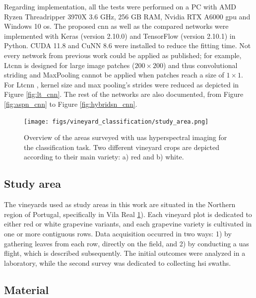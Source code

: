 Regarding implementation, all the tests were performed on a PC with AMD Ryzen Threadripper 3970X 3.6 GHz, 256 GB RAM, Nvidia RTX A6000 \acrshort{gpu} and Windows 10 \acrshort{os}. The proposed \acrshort{cnn} as well as the compared networks were implemented with Keras (version 2.10.0) and TensorFlow (version 2.10.1) in Python. CUDA 11.8 and CuNN 8.6 were installed to reduce the fitting time. Not every network from previous work could be applied as published; for example, Lt\acrshort{cnn} is designed for large image patches ($200\times200$) and thus convolutional striding and MaxPooling cannot be applied when patches reach a size of $1\times1$. For Lt\acrshort{cnn} \cite{lu_hyperspectral_2022}, kernel size and max pooling's strides were reduced as depicted in Figure \ref{fig:lt_cnn}. The rest of the networks are also documented, from Figure \ref{fig:aspn_cnn} to Figure \ref{fig:hybridsn_cnn}.

\begin{figure}[bht]
    \centering
    \texttt{[image: figs/vineyard\_classification/study\_area.png]}
	\caption{Overview of the areas surveyed with \acrshort{uas} hyperspectral imaging for the classification task. Two different vineyard crops are depicted according to their main variety: a) red and b) white. }
	\label{fig:vineyard_study_area}
\end{figure}

\subsection{Study area}

The vineyards used as study areas in this work are situated in the Northern region of Portugal, specifically in Vila Real \ref{fig:vineyard_study_area}). Each vineyard plot is dedicated to either red or white grapevine variants, and each grapevine variety is cultivated in one or more contiguous rows. Data acquisition occurred in two ways: 1) by gathering leaves from each row, directly on the field, and 2) by conducting a \acrshort{uas} flight, which is described subsequently. The initial outcomes were analyzed in a laboratory, while the second survey was dedicated to collecting \acrshort{hsi} swaths.

\subsection{Material}

